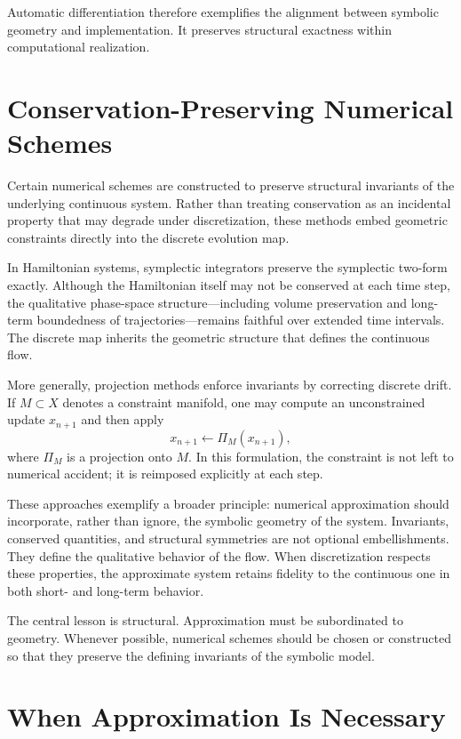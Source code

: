 \documentclass[12pt]{book}
\begin{document}
Automatic differentiation therefore exemplifies the alignment between
symbolic geometry and implementation. It preserves structural
exactness within computational realization.

\section{Conservation-Preserving Numerical Schemes}

Certain numerical schemes are constructed to preserve structural
invariants of the underlying continuous system. Rather than treating
conservation as an incidental property that may degrade under
discretization, these methods embed geometric constraints directly into
the discrete evolution map.

In Hamiltonian systems, symplectic integrators preserve the symplectic
two-form exactly. Although the Hamiltonian itself may not be conserved
at each time step, the qualitative phase-space structure---including
volume preservation and long-term boundedness of trajectories---remains faithful over extended time intervals. The discrete map
inherits the geometric structure that defines the continuous flow.

More generally, projection methods enforce invariants by correcting
discrete drift. If $M \subset X$ denotes a constraint manifold, one
may compute an unconstrained update $x_{n+1}$ and then apply
\[
x_{n+1} \leftarrow \Pi_M(x_{n+1}),
\]
where $\Pi_M$ is a projection onto $M$. In this formulation, the
constraint is not left to numerical accident; it is reimposed
explicitly at each step.

These approaches exemplify a broader principle: numerical approximation
should incorporate, rather than ignore, the symbolic geometry of the
system. Invariants, conserved quantities, and structural symmetries
are not optional embellishments. They define the qualitative behavior
of the flow. When discretization respects these properties, the
approximate system retains fidelity to the continuous one in both
short- and long-term behavior.

The central lesson is structural. Approximation must be subordinated
to geometry. Whenever possible, numerical schemes should be chosen or
constructed so that they preserve the defining invariants of the
symbolic model.

\section{When Approximation Is Necessary}
\end{document}
